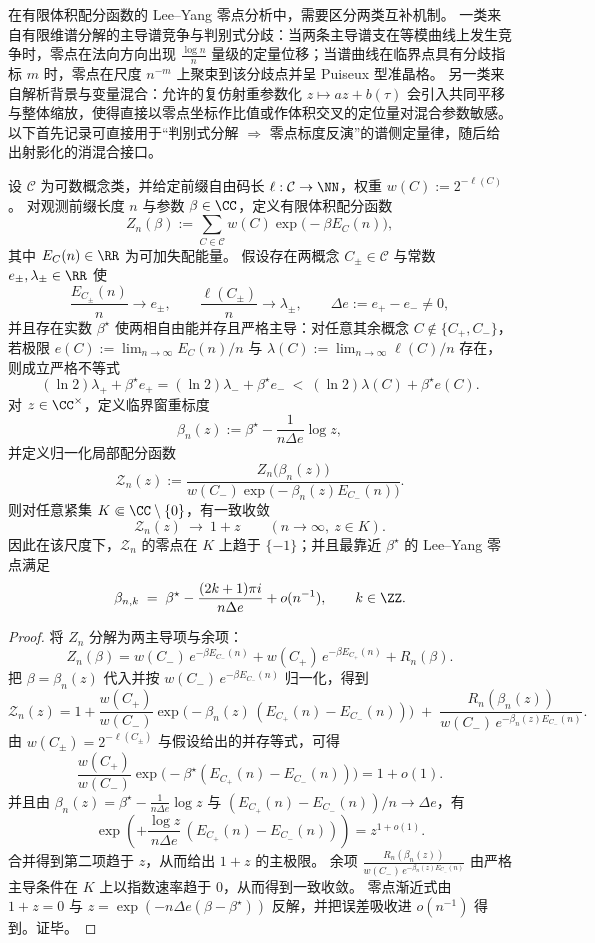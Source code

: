 在有限体积配分函数的 Lee--Yang 零点分析中，需要区分两类互补机制。
一类来自有限维谱分解的主导谱竞争与判别式分歧：当两条主导谱支在等模曲线上发生竞争时，零点在法向方向出现 \(\frac{\log n}{n}\) 量级的定量位移；当谱曲线在临界点具有分歧指标 \(m\) 时，零点在尺度 \(n^{-m}\) 上聚束到该分歧点并呈 Puiseux 型准晶格。
另一类来自解析背景与变量混合：允许的复仿射重参数化 \(z\mapsto az+b(\tau)\) 会引入共同平移与整体缩放，使得直接以零点坐标作比值或作体积交叉的定位量对混合参数敏感。
以下首先记录可直接用于“判别式分解 \(\Rightarrow\) 零点标度反演”的谱侧定量律，随后给出射影化的消混合接口。

\begin{theorem}[两相并存临界窗的尺度极限与零点凝聚]\label{thm:xi-godel-leyang-two-phase-coexistence-window}
设 \(\mathcal C\) 为可数概念类，并给定前缀自由码长 \(\ell:\mathcal C\to\NN\)，权重 \(w(C):=2^{-\ell(C)}\)。
对观测前缀长度 \(n\) 与参数 \(\beta\in\CC\)，定义有限体积配分函数
\[
Z_n(\beta):=\sum_{C\in\mathcal C}w(C)\exp\!\bigl(-\beta E_C(n)\bigr),
\]
其中 \(E_C(n)\in\RR\) 为可加失配能量。
假设存在两概念 \(C_\pm\in\mathcal C\) 与常数 \(e_\pm,\lambda_\pm\in\RR\) 使
\[
\frac{E_{C_\pm}(n)}{n}\to e_\pm,\qquad \frac{\ell(C_\pm)}{n}\to \lambda_\pm,
\qquad
\Delta e:=e_+-e_-\neq 0,
\]
并且存在实数 \(\beta^\star\) 使两相自由能并存且严格主导：对任意其余概念 \(C\notin\{C_+,C_-\}\)，若极限
\(
e(C):=\lim_{n\to\infty}E_C(n)/n
\) 与
\(
\lambda(C):=\lim_{n\to\infty}\ell(C)/n
\)
存在，则成立严格不等式
\[
(\ln 2)\lambda_+ + \beta^\star e_+
=
(\ln 2)\lambda_- + \beta^\star e_-
\ <\ (\ln 2)\lambda(C)+\beta^\star e(C).
\]
对 \(z\in\CC^\times\)，定义临界窗重标度
\[
\beta_{n}(z):=\beta^\star-\frac{1}{n\Delta e}\log z,
\]
并定义归一化局部配分函数
\[
\mathcal Z_n(z):=
\frac{Z_n\!\bigl(\beta_n(z)\bigr)}
{w(C_-)\exp\!\bigl(-\beta_n(z)E_{C_-}(n)\bigr)}.
\]
则对任意紧集 \(K\Subset\CC\setminus\{0\}\)，有一致收敛
\[
\mathcal Z_n(z)\ \longrightarrow\ 1+z
\qquad(n\to\infty,\ z\in K).
\]
因此在该尺度下，\(\mathcal Z_n\) 的零点在 \(K\) 上趋于 \(\{-1\}\)；并且最靠近 \(\beta^\star\) 的 Lee--Yang 零点满足
\[
\beta_{n,k}
\;=\;
\beta^\star-\frac{(2k+1)\pi i}{n\Delta e}+o(n^{-1}),
\qquad k\in\ZZ.
\]
\end{theorem}
\begin{proof}
将 \(Z_n\) 分解为两主导项与余项：
\[
Z_n(\beta)=w(C_-)\,e^{-\beta E_{C_-}(n)}+w(C_+)\,e^{-\beta E_{C_+}(n)}+R_n(\beta).
\]
把 \(\beta=\beta_n(z)\) 代入并按 \(w(C_-)\,e^{-\beta E_{C_-}(n)}\) 归一化，得到
\[
\mathcal Z_n(z)=1+\frac{w(C_+)}{w(C_-)}\exp\!\bigl(-\beta_n(z)\,(E_{C_+}(n)-E_{C_-}(n))\bigr)
\;+\;\frac{R_n(\beta_n(z))}{w(C_-)\,e^{-\beta_n(z)E_{C_-}(n)}}.
\]
由 \(w(C_\pm)=2^{-\ell(C_\pm)}\) 与假设给出的并存等式，可得
\[
\frac{w(C_+)}{w(C_-)}\exp\!\bigl(-\beta^\star(E_{C_+}(n)-E_{C_-}(n))\bigr)=1+o(1).
\]
并且由 \(\beta_n(z)=\beta^\star-\frac{1}{n\Delta e}\log z\) 与 \((E_{C_+}(n)-E_{C_-}(n))/n\to \Delta e\)，有
\[
\exp\!\left(+\frac{\log z}{n\Delta e}\,(E_{C_+}(n)-E_{C_-}(n))\right)=z^{1+o(1)}.
\]
合并得到第二项趋于 \(z\)，从而给出 \(1+z\) 的主极限。
余项 \(\frac{R_n(\beta_n(z))}{w(C_-)\,e^{-\beta_n(z)E_{C_-}(n)}}\) 由严格主导条件在 \(K\) 上以指数速率趋于 \(0\)，从而得到一致收敛。
零点渐近式由 \(1+z=0\) 与 \(z=\exp(-n\Delta e(\beta-\beta^\star))\) 反解，并把误差吸收进 \(o(n^{-1})\) 得到。证毕。
\end{proof}

